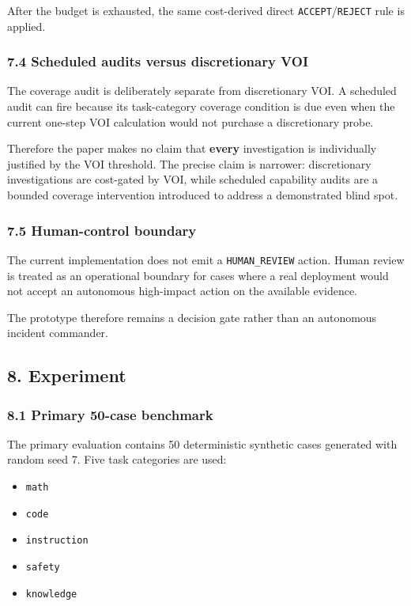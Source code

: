 \documentclass[
]{article}
\providecommand{\tightlist}{%
  \setlength{\itemsep}{0pt}\setlength{\parskip}{0pt}}
\begin{document}
After the budget is exhausted, the same cost-derived direct
\texttt{ACCEPT}/\texttt{REJECT} rule is applied.

\subsubsection{7.4 Scheduled audits versus discretionary
VOI}\label{scheduled-audits-versus-discretionary-voi}

The coverage audit is deliberately separate from discretionary VOI. A
scheduled audit can fire because its task-category coverage condition is
due even when the current one-step VOI calculation would not purchase a
discretionary probe.

Therefore the paper makes no claim that \textbf{every} investigation is
individually justified by the VOI threshold. The precise claim is
narrower: discretionary investigations are cost-gated by VOI, while
scheduled capability audits are a bounded coverage intervention
introduced to address a demonstrated blind spot.

\subsubsection{7.5 Human-control boundary}\label{human-control-boundary}

The current implementation does not emit a \texttt{HUMAN\_REVIEW}
action. Human review is treated as an operational boundary for cases
where a real deployment would not accept an autonomous high-impact
action on the available evidence.

The prototype therefore remains a decision gate rather than an
autonomous incident commander.

\subsection{8. Experiment}\label{experiment}

\subsubsection{8.1 Primary 50-case
benchmark}\label{primary-50-case-benchmark}

The primary evaluation contains 50 deterministic synthetic cases
generated with random seed 7. Five task categories are used:

\begin{itemize}
\tightlist
\item
  \texttt{math}
\item
  \texttt{code}
\item
  \texttt{instruction}
\item
  \texttt{safety}
\item
  \texttt{knowledge}
\end{itemize}
\end{document}
